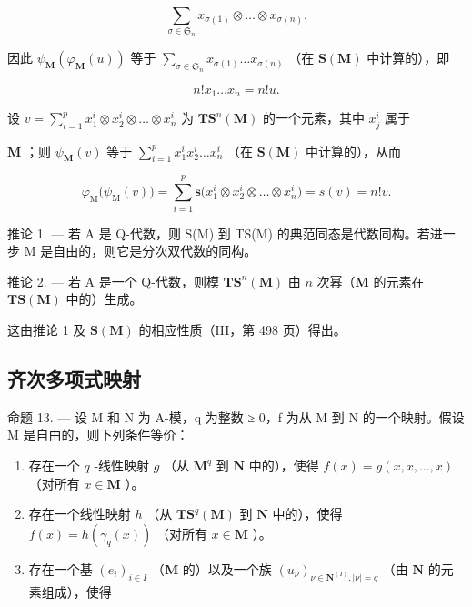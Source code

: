 \[
\sum_ {\sigma \in \mathfrak {S} _ {n}} x _ {\sigma (1)} \otimes \dots \otimes x _ {\sigma (n)}.
\]

因此 \(\psi_{\mathbf{M}}(\varphi_{\mathbf{M}}(u))\) 等于 \(\sum_{\sigma \in \mathfrak{S}_n}x_{\sigma (1)}\ldots x_{\sigma (n)}\) （在 \(\mathbf{S}(\mathbf{M})\) 中计算的），即

\[
n! x _ {1} \dots x _ {n} = n! u.
\]

设 \(v = \sum_{i=1}^{p} x_1^i \otimes x_2^i \otimes \ldots \otimes x_n^i\) 为 \(\mathbf{TS}^n(\mathbf{M})\) 的一个元素，其中 \(x_j^i\) 属于

\(\mathbf{M}\) ；则 \(\psi_{\mathbf{M}}(v)\) 等于 \(\sum_{i=1}^{p} x_1^i x_2^i \ldots x_n^i\) （在 \(\mathbf{S}(\mathbf{M})\) 中计算的），从而

\[
\varphi_ {\mathrm{M}} \big (\psi_ {\mathrm{M}} (v) \big) = \sum_ {i = 1} ^ {p} \mathbf {s} \big (x _ {1} ^ {i} \otimes x _ {2} ^ {i} \otimes \dots \otimes x _ {n} ^ {i} \big) = s (v) = n! v.
\]

推论 1. --- 若 A 是 Q-代数，则 S(M) 到 TS(M) 的典范同态是代数同构。若进一步 M 是自由的，则它是分次双代数的同构。

推论 2. --- 若 A 是一个 Q-代数，则模 \(\mathbf{TS}^n (\mathbf{M})\) 由 \(n\) 次幂（\(\mathbf{M}\) 的元素在 \(\mathbf{TS}(\mathbf{M})\) 中的）生成。

这由推论 1 及 \(\mathbf{S}(\mathbf{M})\) 的相应性质（III，第 498 页）得出。

\subsection{齐次多项式映射}

命题 13. --- 设 M 和 N 为 A-模，q 为整数 ≥ 0，f 为从 M 到 N 的一个映射。假设 M 是自由的，则下列条件等价：

\begin{enumerate}
\def\labelenumi{(\roman{enumi})}
\item
  存在一个 \(q\) -线性映射 \(g\) （从 \(\mathbf{M}^q\) 到 \(\mathbf{N}\) 中的），使得 \(f(x) = g(x, x, \ldots, x)\) （对所有 \(x \in \mathbf{M}\) ）。
\item
  存在一个线性映射 \(h\) （从 \(\mathbf{T}\mathbf{S}^q (\mathbf{M})\) 到 \(\mathbf{N}\) 中的），使得 \(f(x) = h(\gamma_q(x))\) （对所有 \(x \in \mathbf{M}\) ）。
\item
  存在一个基 \((e_i)_{i\in I}\) （\(\mathbf{M}\) 的）以及一个族 \((u_{\nu})_{\nu \in \mathbf{N}^{(I)},|\nu| = q}\) （由 \(\mathbf{N}\) 的元素组成），使得
\end{enumerate}

